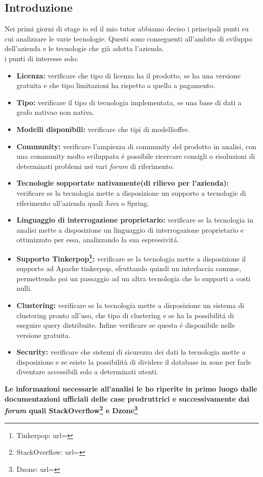 \subsection{Introduzione}
Nei primi giorni di stage io ed il mio tutor abbiamo deciso i principali punti su cui analizzare le varie tecnologie. Questi sono conseguenti all'ambito di sviluppo dell'azienda e le tecnologie che già adotta l'azienda.\\
i punti di interesse solo:
\begin{itemize}
\item{\textbf{Licenza:}} verificare che tipo di licenza ha il prodotto, se ha una versione gratuita e che tipo limitazioni ha rispetto a quella a pagamento.
\item{\textbf{Tipo:}} verificare il tipo di tecnologia implementata, se una base di dati a grafo nativa\glsfirstoccur o non nativa\glsfirstoccur.
\item{\textbf{Modelli disponibili:}} verificare che tipi di modelli\glsfirstoccur offre.
\item{\textbf{Community:}} verificare l'ampiezza di community del prodotto in analisi, con una community molto sviluppata é possibile ricercare consigli o risoluzioni di determinati problemi nei vari \textit{forum} di riferimento.
\item{\textbf{Tecnologie sopportate nativamente(di rilievo per l'azienda):}} verificare se la tecnologia mette a disposizione un supporto a tecnologie di riferimento all'azienda quali Java o Spring.
\item{\textbf{Linguaggio di interrogazione proprietario:}} verificare se la tecnologia in analisi mette a disposizione un linguaggio di interrogazione proprietario e ottimizzato per essa, analizzando la sua espressivitá.
\item{\textbf{Supporto Tinkerpop\footnote{Tinkerpop: url= }:}} verificare se la tecnologia mette a disposizione il supporto ad Apache tinkerpop, sfruttando quindi un interfaccia comune, permettendo poi un passaggio ad un altra tecnologia che lo supporti a costi nulli.
\item{\textbf{Clustering\glsfirstoccur:}} verificare se la tecnologia mette a disposizione un sistema di clustering pronto all'uso, che tipo di clustering e se ha la possibilitá di eseguire query distribuite. Infine verificare se questa é disponibile nelle versione gratuita.
\item{\textbf{Security:}} verificare che sistemi di sicurezza dei dati la tecnologia mette a disposizione e se esiste la possibilità di dividere il database in zone per farle diventare accessibili solo a determinati utenti.\\

\end{itemize}
\textbf{Le informazioni necessarie all'analisi le ho riperite in primo luogo dalle documentazioni ufficiali delle case prodruttrici e successivamente dai \textit{forum} quali StackOverflow\footnote{StackOverflow: url= } e Dzone\footnote{Dzone: url= }}
